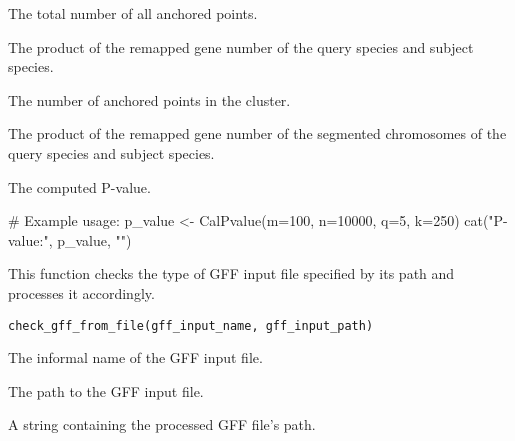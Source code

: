 \documentclass[a4paper]{book}
\begin{document}
%
\begin{Arguments}
\begin{ldescription}
\item[\code{m}] The total number of all anchored points.

\item[\code{n}] The product of the remapped gene number of the query species and subject species.

\item[\code{q}] The number of anchored points in the cluster.

\item[\code{k}] The product of the remapped gene number of the segmented chromosomes
of the query species and subject species.
\end{ldescription}
\end{Arguments}
%
\begin{Value}
The computed P-value.
\end{Value}
%
\begin{Examples}
\begin{ExampleCode}
# Example usage:
p_value <- CalPvalue(m=100, n=10000, q=5, k=250)
cat("P-value:", p_value, "\n")
\end{ExampleCode}
\end{Examples}
%
\begin{Description}\relax
This function checks the type of GFF input file specified by its path and processes it accordingly.
\end{Description}
%
\begin{Usage}
\begin{verbatim}
check_gff_from_file(gff_input_name, gff_input_path)
\end{verbatim}
\end{Usage}
%
\begin{Arguments}
\begin{ldescription}
\item[\code{gff\_input\_name}] The informal name of the GFF input file.

\item[\code{gff\_input\_path}] The path to the GFF input file.
\end{ldescription}
\end{Arguments}
%
\begin{Value}
A string containing the processed GFF file's path.
\end{Value}
\end{document}
